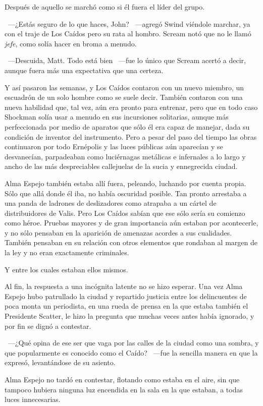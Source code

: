 Después de aquello se marchó como si él fuera el líder del grupo.

~---¿Estás seguro de lo que haces, John? ~---agregó Swind viéndole marchar, ya con el traje de Los Caídos pero su rata al hombro. Scream notó que no le llamó \emph{jefe}, como solía hacer en broma a menudo.

~---Descuida, Matt. Todo está bien ~---fue lo único que Scream acertó a decir, aunque fuera más una expectativa que una certeza.

Y así pasaron las semanas, y Los Caídos contaron con un nuevo miembro, un escuadrón de un solo hombre como se suele decir. También contaron con una nueva habilidad que, tal vez, aún era pronto para entrenar, pero que en todo caso Shockman solía usar a menudo en sus incursiones solitarias, aunque más perfeccionada por medio de aparatos que sólo él era capaz de manejar, dada su condición de inventor del instrumento. Pero a pesar del paso del tiempo las obras continuaron por todo Ernépolis y las luces públicas aún aparecían y se desvanecían, parpadeaban como luciérnagas metálicas e infernales a lo largo y ancho de las más despreciables callejuelas de la sucia y ennegrecida ciudad.

Alma Espejo también estaba allí fuera, peleando, luchando por cuenta propia. Sólo que allá donde él iba, no había oscuridad posible. Tan pronto arrestaba a una panda de ladrones de deslizadores como atrapaba a un cártel de distribuidores de Valis. Pero Los Caídos sabían que ese sólo sería su comienzo como héroe. Pruebas mayores y de gran importancia aún estaban por acontecerle, y no sólo pensaban en la aparición de amenazas acordes a sus cualidades. También pensaban en su relación con otros elementos que rondaban al margen de la ley y no eran exactamente criminales.

Y entre los cuales estaban ellos mismos.

Al fin, la respuesta a una incógnita latente no se hizo esperar. Una vez Alma Espejo hubo patrullado la ciudad y repartido justicia entre los delincuentes de poca monta un periodista, en una rueda de prensa en la que estaba también el Presidente Scatter, le hizo la pregunta que muchas veces antes había ignorado, y por fin se dignó a contestar.

~---¿Qué opina de ese ser que vaga por las calles de la ciudad como una sombra, y que popularmente es conocido como el Caído? ~---fue la sencilla manera en que la expresó, levantándose de su asiento.

Alma Espejo no tardó en contestar, flotando como estaba en el aire, sin que tampoco hubiera ninguna luz encendida en la sala en la que estaban, a todas luces innecesarias.

